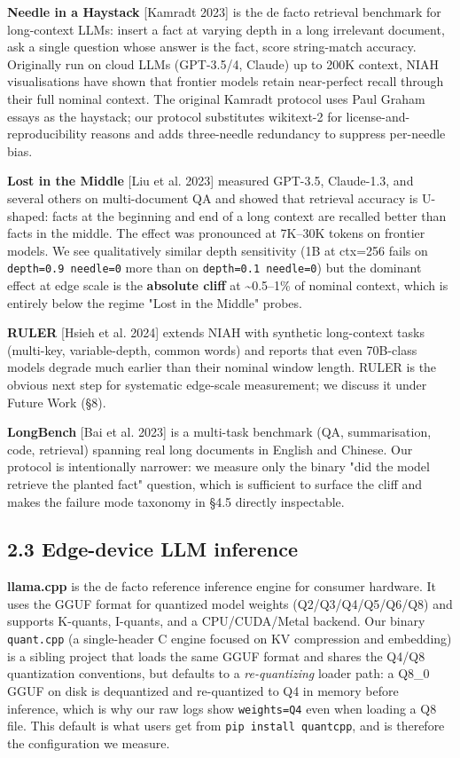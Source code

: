 \documentclass[11pt]{article}
\begin{document}
\textbf{Needle in a Haystack} [Kamradt 2023] is the de facto retrieval benchmark for long-context LLMs: insert a fact at varying depth in a long irrelevant document, ask a single question whose answer is the fact, score string-match accuracy. Originally run on cloud LLMs (GPT-3.5/4, Claude) up to 200K context, NIAH visualisations have shown that frontier models retain near-perfect recall through their full nominal context. The original Kamradt protocol uses Paul Graham essays as the haystack; our protocol substitutes wikitext-2 for license-and-reproducibility reasons and adds three-needle redundancy to suppress per-needle bias.


\textbf{Lost in the Middle} [Liu et al. 2023] measured GPT-3.5, Claude-1.3, and several others on multi-document QA and showed that retrieval accuracy is U-shaped: facts at the beginning and end of a long context are recalled better than facts in the middle. The effect was pronounced at 7K–30K tokens on frontier models. We see qualitatively similar depth sensitivity (1B at ctx=256 fails on \texttt{depth=0.9 needle=0} more than on \texttt{depth=0.1 needle=0}) but the dominant effect at edge scale is the \textbf{absolute cliff} at \textasciitilde{}0.5–1\% of nominal context, which is entirely below the regime "Lost in the Middle" probes.


\textbf{RULER} [Hsieh et al. 2024] extends NIAH with synthetic long-context tasks (multi-key, variable-depth, common words) and reports that even 70B-class models degrade much earlier than their nominal window length. RULER is the obvious next step for systematic edge-scale measurement; we discuss it under Future Work (§8).


\textbf{LongBench} [Bai et al. 2023] is a multi-task benchmark (QA, summarisation, code, retrieval) spanning real long documents in English and Chinese. Our protocol is intentionally narrower: we measure only the binary "did the model retrieve the planted fact" question, which is sufficient to surface the cliff and makes the failure mode taxonomy in §4.5 directly inspectable.


\subsection*{2.3 Edge-device LLM inference}


\textbf{llama.cpp} is the de facto reference inference engine for consumer hardware. It uses the GGUF format for quantized model weights (Q2/Q3/Q4/Q5/Q6/Q8) and supports K-quants, I-quants, and a CPU/CUDA/Metal backend. Our binary \texttt{quant.cpp} (a single-header C engine focused on KV compression and embedding) is a sibling project that loads the same GGUF format and shares the Q4/Q8 quantization conventions, but defaults to a \textit{re-quantizing} loader path: a Q8\_0 GGUF on disk is dequantized and re-quantized to Q4 in memory before inference, which is why our raw logs show \texttt{weights=Q4} even when loading a Q8 file. This default is what users get from \texttt{pip install quantcpp}, and is therefore the configuration we measure.
\end{document}

